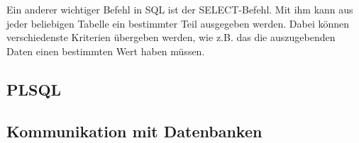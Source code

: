 Ein anderer wichtiger Befehl in SQL ist der SELECT-Befehl. Mit ihm kann aus jeder beliebigen Tabelle ein bestimmter Teil ausgegeben werden. Dabei können verschiedenste Kriterien übergeben werden, wie z.B. das die auszugebenden Daten einen bestimmten Wert haben müssen.

\subsection{PLSQL}

\subsection{Kommunikation mit Datenbanken}

